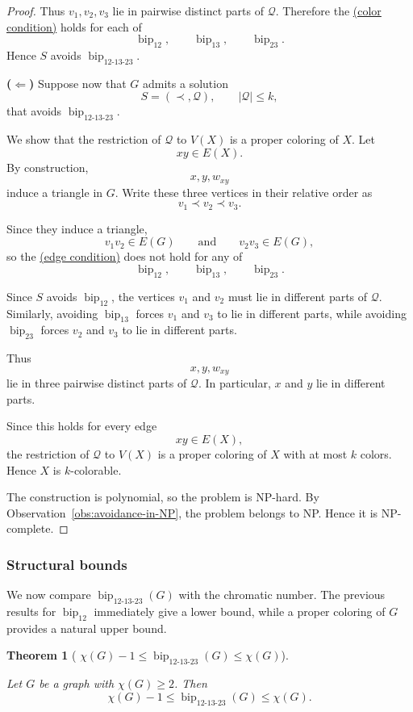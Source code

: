 \documentclass[12pt]{article}
\theoremstyle{plain}
\newtheorem{theorem}{Theorem}[section]
\theoremstyle{definition}
\theoremstyle{remark}
\theoremstyle{definition}
\newcommand{\edgecondition}{%
  \hyperref[def:avoid:cond:edge]{(edge condition)}\xspace
}
\newcommand{\colorcondition}{%
  \hyperref[def:avoid:cond:color]{(color condition)}\xspace
}
\newcommand{\biplabel}{\mathrm{bip}}
\DeclareRobustCommand{\bipparam}[1]{%
  \ensuremath{\mathop{\biplabel}\nolimits_{#1}}%
}
\begin{document}
\begin{proof}
Thus \(v_1,v_2,v_3\) lie in pairwise distinct parts of \(\mathcal Q\).
Therefore the \colorcondition{} holds for each of
\[
\bipparam{12},
\qquad
\bipparam{13},
\qquad
\bipparam{23}.
\]
Hence \(S\) avoids
\(\bipparam{12\text{-}13\text{-}23}\).

\medskip
\noindent\textbf{(\(\Leftarrow\))}
Suppose now that \(G\) admits a solution
\[
S=(\prec,\mathcal Q),
\qquad
|\mathcal Q|\le k,
\]
that avoids
\(\bipparam{12\text{-}13\text{-}23}\).

We show that the restriction of \(\mathcal Q\) to \(V(X)\) is a proper
coloring of \(X\). Let
\[
xy\in E(X).
\]
By construction,
\[
x,y,w_{xy}
\]
induce a triangle in \(G\). Write these three vertices in their relative
order as
\[
v_1\prec v_2\prec v_3.
\]

Since they induce a triangle,
\[
v_1v_2\in E(G)
\qquad\text{and}\qquad
v_2v_3\in E(G),
\]
so the \edgecondition{} does not hold for any of
\[
\bipparam{12},
\qquad
\bipparam{13},
\qquad
\bipparam{23}.
\]

Since \(S\) avoids \(\bipparam{12}\), the vertices \(v_1\) and \(v_2\)
must lie in different parts of \(\mathcal Q\). Similarly, avoiding
\(\bipparam{13}\) forces \(v_1\) and \(v_3\) to lie in different parts,
while avoiding \(\bipparam{23}\) forces \(v_2\) and \(v_3\) to lie in
different parts.

Thus
\[
x,y,w_{xy}
\]
lie in three pairwise distinct parts of \(\mathcal Q\). In particular,
\(x\) and \(y\) lie in different parts.

Since this holds for every edge
\[
xy\in E(X),
\]
the restriction of \(\mathcal Q\) to \(V(X)\) is a proper coloring of
\(X\) with at most \(k\) colors. Hence \(X\) is \(k\)-colorable.

The construction is polynomial, so the problem is NP-hard. By
Observation~\ref{obs:avoidance-in-NP}, the problem belongs to NP.
Hence it is NP-complete.
\end{proof}



\subsubsection{Structural bounds}

We now compare \(\bipparam{12\text{-}13\text{-}23}(G)\) with the
chromatic number. The previous results for \(\bipparam{12}\) immediately
give a lower bound, while a proper coloring of \(G\) provides a natural
upper bound.


\begin{theorem}[
\texorpdfstring{
\(\chi(G)-1\le\bipparam{12\text{-}13\text{-}23}(G)\le\chi(G)\)}
{Bounds for bip12-13-23}
]
\label{thm:bip12-13-23-bounds}

Let \(G\) be a graph with \(\chi(G)\ge2\). Then
\[
\chi(G)-1
\le
\bipparam{12\text{-}13\text{-}23}(G)
\le
\chi(G).
\]
\end{theorem}
\end{document}
